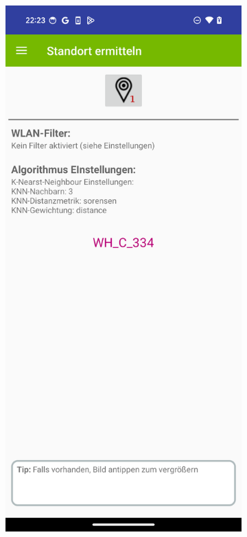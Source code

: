 \begin{figure}[h!]
    \centering
    \begin{subfigure}[b]{0.3\textwidth}
        \centering
        \includegraphics[width=\textwidth]{images/screenshots/localize.png}

\end{subfigure}
\end{figure}
